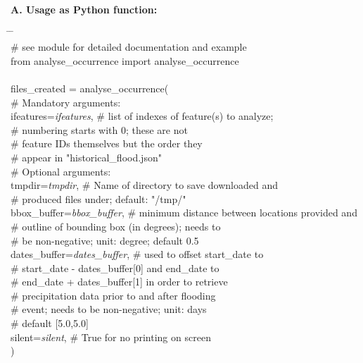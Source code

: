 \documentclass[10pt,a4paper,titlepage,parskip]{scrartcl}
\newenvironment{ttfont}{\fontfamily{\ttdefault}\selectfont}{\par}
\newcommand{\GRAU}[1]{\textcolor{ufzgray2}{#1}}
\begin{document}
\textbf{A. Usage as Python function:}
\begin{framed}
	\vspace*{-1.2cm}
	\begin{ttfont}
		\begin{tabbing}
			\hspace{1.0cm} \= \hspace{5.2cm} \= \kill \\[4pt]
			\GRAU{\# see module for detailed documentation and example}\\
			from analyse\_occurrence import analyse\_occurrence\\
			\\
			files\_created = analyse\_occurrence(\\
			\> \GRAU{\# Mandatory arguments:}\\
			\> ifeatures=\textit{ifeatures}, \> \GRAU{\# list of indexes of feature(s) to analyze;}\\
			\> \> \GRAU{\# numbering starts with 0; these are not }\\
			\> \> \GRAU{\# feature IDs themselves but the order they }\\
			\> \> \GRAU{\# appear in "historical\_flood.json"}\\
			\> \GRAU{\# Optional arguments:}\\
			\> tmpdir=\textit{tmpdir}, \> \GRAU{\# Name of directory to save downloaded and}\\
			\> \> \GRAU{\# produced files under; default: "/tmp/"}\\
			\> bbox\_buffer=\textit{bbox\_buffer}, \> \GRAU{\# minimum distance between locations provided and}\\
			\> \> \GRAU{\# outline of bounding box (in degrees); needs to}\\
			\> \> \GRAU{\# be non-negative; unit: degree; default 0.5}\\
			\> dates\_buffer=\textit{dates\_buffer}, \> \GRAU{\# used to offset start\_date to}\\
			\> \> \GRAU{\# start\_date - dates\_buffer[0] and end\_date to }\\
			\> \> \GRAU{\# end\_date + dates\_buffer[1] in order to retrieve}\\
			\> \> \GRAU{\# precipitation data prior to and after flooding}\\
			\> \> \GRAU{\# event; needs to be non-negative; unit: days}\\
			\> \> \GRAU{\# default [5.0,5.0]}\\
			\> silent=\textit{silent}, \> \GRAU{\# True for no printing on screen}\\
			\> ) \> 
		\end{tabbing}
	\end{ttfont}
	\vspace*{-0.3cm}
\end{framed}
\end{document}
